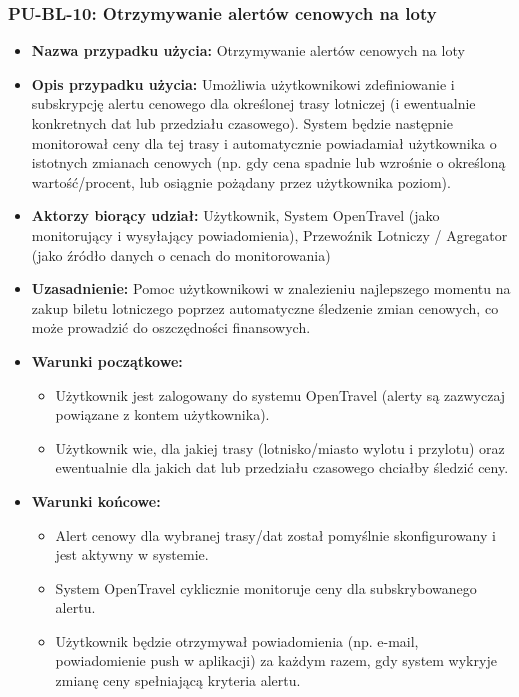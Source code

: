 \documentclass[a4paper,12pt]{article}
\begin{document}
\subsubsection{PU-BL-10: Otrzymywanie alertów cenowych na loty}
\begin{itemize}
    \item \textbf{Nazwa przypadku użycia:} Otrzymywanie alertów cenowych na loty
    \item \textbf{Opis przypadku użycia:} Umożliwia użytkownikowi zdefiniowanie i subskrypcję alertu cenowego dla określonej trasy lotniczej (i ewentualnie konkretnych dat lub przedziału czasowego). System będzie następnie monitorował ceny dla tej trasy i automatycznie powiadamiał użytkownika o istotnych zmianach cenowych (np. gdy cena spadnie lub wzrośnie o określoną wartość/procent, lub osiągnie pożądany przez użytkownika poziom).
    \item \textbf{Aktorzy biorący udział:} Użytkownik, System OpenTravel (jako monitorujący i wysyłający powiadomienia), Przewoźnik Lotniczy / Agregator (jako źródło danych o cenach do monitorowania)
    \item \textbf{Uzasadnienie:} Pomoc użytkownikowi w znalezieniu najlepszego momentu na zakup biletu lotniczego poprzez automatyczne śledzenie zmian cenowych, co może prowadzić do oszczędności finansowych.
    \item \textbf{Warunki początkowe:}
        \begin{itemize}
            \item Użytkownik jest zalogowany do systemu OpenTravel (alerty są zazwyczaj powiązane z kontem użytkownika).
            \item Użytkownik wie, dla jakiej trasy (lotnisko/miasto wylotu i przylotu) oraz ewentualnie dla jakich dat lub przedziału czasowego chciałby śledzić ceny.
        \end{itemize}
    \item \textbf{Warunki końcowe:}
        \begin{itemize}
            \item Alert cenowy dla wybranej trasy/dat został pomyślnie skonfigurowany i jest aktywny w systemie.
            \item System OpenTravel cyklicznie monitoruje ceny dla subskrybowanego alertu.
            \item Użytkownik będzie otrzymywał powiadomienia (np. e-mail, powiadomienie push w aplikacji) za każdym razem, gdy system wykryje zmianę ceny spełniającą kryteria alertu.
        \end{itemize}

\end{itemize}
\end{document}
